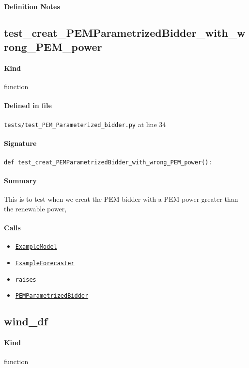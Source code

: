 \documentclass[11pt]{report}
\begin{document}
\paragraph{Definition Notes}
\subsection{test\_creat\_PEMParametrizedBidder\_with\_wrong\_PEM\_power}
\label{def:tests-test_PEM_Parameterized_bidder.py:test_creat_PEMParametrizedBidder_with_wrong_PEM_power:L34}
\paragraph{Kind} function
\paragraph{Defined in file} \texttt{tests/test\_PEM\_Parameterized\_bidder.py} at line 34
\paragraph{Signature} \texttt{def test\_creat\_PEMParametrizedBidder\_with\_wrong\_PEM\_power():}
\paragraph{Summary} This is to test when we creat the PEM bidder with a PEM power greater than the renewable power,
\paragraph{Calls}
\begin{itemize}[leftmargin=*]
  \item \hyperref[def:tests-util.py:ExampleModel:L25]{\texttt{ExampleModel}}
  \item \hyperref[def:tests-util.py:ExampleForecaster:L259]{\texttt{ExampleForecaster}}
  \item \texttt{raises}
  \item \hyperref[def:bidder.py:PEMParametrizedBidder:L1502]{\texttt{PEMParametrizedBidder}}
\end{itemize}
\subsection{wind\_df}
\label{def:tests-test_PEM_Parameterized_bidder.py:wind_df:L59}
\paragraph{Kind} function
\end{document}
